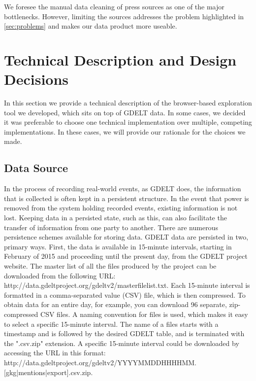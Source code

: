 \documentclass[preprint,authoryear,12pt]{elsarticle/elsarticle}
\begin{document}
We foresee the manual data cleaning of press sources as one of the major bottlenecks. However, limiting the sources addresses the problem highlighted in \ref{sec:problems} and makes our data product more useable. 

\section{Technical Description and Design Decisions}
\label{sec:tech}
In this section we provide a technical description of the browser-based exploration tool we developed, which sits on top of GDELT data. In some cases, we decided it was preferable to choose one technical implementation over multiple, competing implementations. In these cases, we will provide our rationale for the choices we made.

\subsection{Data Source}
In the process of recording real-world events, as GDELT does, the information that is collected is often kept in a persistent structure. In the event that power is removed from the system holding recorded events, existing information is not lost. Keeping data in a persisted state, such as this, can also facilitate the transfer of information from one party to another. There are numerous persistence schemes available for storing data. GDELT data are persisted in two, primary ways.  First, the data is available in 15-minute intervals, starting in February of 2015 and proceeding until the present day, from the GDELT project website. The master list of all the files produced by the project can be downloaded from the following URL: http://data.gdeltproject.org/gdeltv2/masterfilelist.txt. Each 15-minute interval is formatted in a comma-separated value (CSV) file, which is then compressed. To obtain data for an entire day, for example, you can download 96 separate, zip-compressed CSV files. A naming convention for files is used, which makes it easy to select a specific 15-minute interval. The name of a files starts with a timestamp and is followed by the desired GDELT table, and is terminated with the ".csv.zip" extension. A specific 15-minute interval could be downloaded by accessing the URL in this format: http://data.gdeltproject.org/gdeltv2/YYYYMMDDHHHHMM.[gkg|mentions|export].csv.zip.
\end{document}
